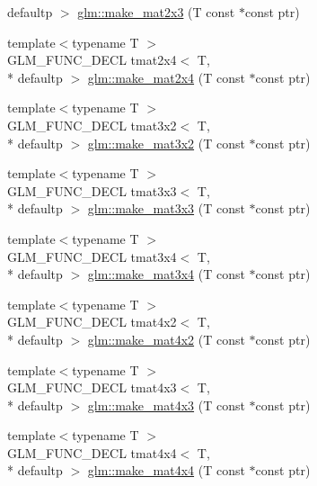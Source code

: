 \begin{DoxyCompactItemize}
defaultp $>$ \hyperlink{group__gtc__type__ptr_ga37988c6dd941f617cdfab86d54375fc1}{glm\-::make\-\_\-mat2x3} (T const $\ast$const ptr)
\item 
{\footnotesize template$<$typename T $>$ }\\G\-L\-M\-\_\-\-F\-U\-N\-C\-\_\-\-D\-E\-C\-L tmat2x4$<$ T, \\*
defaultp $>$ \hyperlink{group__gtc__type__ptr_ga6dfb2ac10859b0cc8e3893ea84fa95b5}{glm\-::make\-\_\-mat2x4} (T const $\ast$const ptr)
\item 
{\footnotesize template$<$typename T $>$ }\\G\-L\-M\-\_\-\-F\-U\-N\-C\-\_\-\-D\-E\-C\-L tmat3x2$<$ T, \\*
defaultp $>$ \hyperlink{group__gtc__type__ptr_gabe1e5066608a66da7a94f802b57b4eed}{glm\-::make\-\_\-mat3x2} (T const $\ast$const ptr)
\item 
{\footnotesize template$<$typename T $>$ }\\G\-L\-M\-\_\-\-F\-U\-N\-C\-\_\-\-D\-E\-C\-L tmat3x3$<$ T, \\*
defaultp $>$ \hyperlink{group__gtc__type__ptr_ga3cbe7adf857c867cee77eae4617abadd}{glm\-::make\-\_\-mat3x3} (T const $\ast$const ptr)
\item 
{\footnotesize template$<$typename T $>$ }\\G\-L\-M\-\_\-\-F\-U\-N\-C\-\_\-\-D\-E\-C\-L tmat3x4$<$ T, \\*
defaultp $>$ \hyperlink{group__gtc__type__ptr_gac083edd180ab4d4b817acc60c516209b}{glm\-::make\-\_\-mat3x4} (T const $\ast$const ptr)
\item 
{\footnotesize template$<$typename T $>$ }\\G\-L\-M\-\_\-\-F\-U\-N\-C\-\_\-\-D\-E\-C\-L tmat4x2$<$ T, \\*
defaultp $>$ \hyperlink{group__gtc__type__ptr_ga967a5b934e67ff9a6d1d0d27a377a264}{glm\-::make\-\_\-mat4x2} (T const $\ast$const ptr)
\item 
{\footnotesize template$<$typename T $>$ }\\G\-L\-M\-\_\-\-F\-U\-N\-C\-\_\-\-D\-E\-C\-L tmat4x3$<$ T, \\*
defaultp $>$ \hyperlink{group__gtc__type__ptr_ga4d42daced532b33cc672280e48670a51}{glm\-::make\-\_\-mat4x3} (T const $\ast$const ptr)
\item 
{\footnotesize template$<$typename T $>$ }\\G\-L\-M\-\_\-\-F\-U\-N\-C\-\_\-\-D\-E\-C\-L tmat4x4$<$ T, \\*
defaultp $>$ \hyperlink{group__gtc__type__ptr_gaf605a5f5e2ff594e8d404b2855b09541}{glm\-::make\-\_\-mat4x4} (T const $\ast$const ptr)

\end{DoxyCompactItemize}
